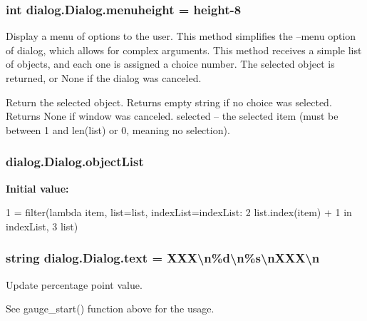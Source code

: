 \subsubsection[{\texorpdfstring{menuheight}{menuheight}}]{\setlength{\rightskip}{0pt plus 5cm}int dialog.\+Dialog.\+menuheight = height-\/8\hspace{0.3cm}{\ttfamily [static]}}\hypertarget{classdialog_1_1_dialog_ade186a1a950a0a06959dc36b278d7d02}{}\label{classdialog_1_1_dialog_ade186a1a950a0a06959dc36b278d7d02}
\begin{DoxyVerb}Display a menu of options to the user.  This method simplifies the
--menu option of dialog, which allows for complex arguments.  This
method receives a simple list of objects, and each one is assigned
a choice number.
The selected object is returned, or None if the dialog was canceled.
\end{DoxyVerb}


\begin{DoxyVerb}Return the selected object.
Returns empty string if no choice was selected.
Returns None if window was canceled.
selected -- the selected item (must be between 1 and len(list)
or 0, meaning no selection).
\end{DoxyVerb}
\subsubsection[{\texorpdfstring{object\+List}{objectList}}]{\setlength{\rightskip}{0pt plus 5cm}dialog.\+Dialog.\+object\+List\hspace{0.3cm}{\ttfamily [static]}}\hypertarget{classdialog_1_1_dialog_aff08fd1b34c4b0794b0b4aa1619590e3}{}\label{classdialog_1_1_dialog_aff08fd1b34c4b0794b0b4aa1619590e3}
{\bfseries Initial value\+:}
\begin{DoxyCode}
1 = filter(\textcolor{keyword}{lambda} item, list=list, indexList=indexList: 
2             list.index(item) + 1 \textcolor{keywordflow}{in} indexList,
3         list)
\end{DoxyCode}
\subsubsection[{\texorpdfstring{text}{text}}]{\setlength{\rightskip}{0pt plus 5cm}string dialog.\+Dialog.\+text = \textquotesingle{}X\+X\+X\textbackslash{}n\%d\textbackslash{}n\%s\textbackslash{}n\+X\+X\+X\textbackslash{}n\textquotesingle{}\hspace{0.3cm}{\ttfamily [static]}}\hypertarget{classdialog_1_1_dialog_ac6496479083764dc18d577e5becfa467}{}\label{classdialog_1_1_dialog_ac6496479083764dc18d577e5becfa467}
\begin{DoxyVerb}Update percentage point value.

See gauge_start() function above for the usage.
\end{DoxyVerb}
